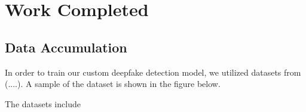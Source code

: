 \chapter{Work Completed}
	\section{Data Accumulation}
		In order to train our custom deepfake detection model, we utilized datasets from (....). A sample of the dataset is shown in the figure below.

		The datasets include

